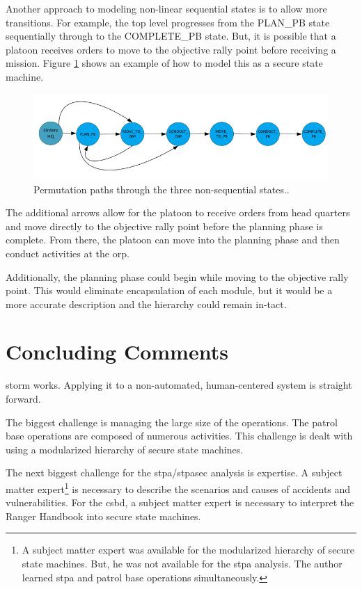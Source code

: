 \documentclass[../../main/main.tex]{subfiles}
\begin{document}
Another approach to modeling non-linear sequential states is to allow more transitions. For example, the top level progresses from the PLAN_PB state sequentially through to the COMPLETE_PB state.  But, it is possible that a platoon receives orders to move to the objective rally point before receiving a mission.  Figure \ref{toplevelAlt} shows an example of how to model this as a secure state machine. 

 \begin{figure}[h!]
\centering
\includegraphics[width=\textwidth]{../figures/toplevelAlt}
\caption{\label{toplevelAlt} Permutation paths through the three non-sequential states..}
\end{figure} 
 
The additional arrows allow for the platoon to receive orders from head quarters and move directly to the objective rally point before the planning phase is complete. From there, the platoon can move into the planning phase and then conduct activities at the \gls{orp}. 

Additionally, the planning phase could begin while moving to the objective rally point.  This would eliminate encapsulation of each module, but it would be a more accurate description and the hierarchy could remain in-tact.  

\section{Concluding Comments}
\gls{storm} works.  Applying it to a non-automated, human-centered system is straight forward.  

The biggest challenge is managing the large size of the operations.  The patrol base operations are composed of numerous activities.  This challenge is dealt with using a modularized hierarchy of secure state machines.

The next biggest challenge for the \gls{stpa}/\gls{stpasec} analysis is expertise.  A subject matter expert\footnote{A subject matter expert was available for the modularized hierarchy of secure state machines.  But, he was not available for the \gls{stpa} analysis.  The author learned \gls{stpa} and patrol base operations simultaneously.} is necessary to describe the scenarios and causes of accidents and vulnerabilities.  For the \gls{csbd}, a subject matter expert is necessary to interpret the Ranger Handbook \cite{rangermanual} into secure state machines. 
\end{document}
